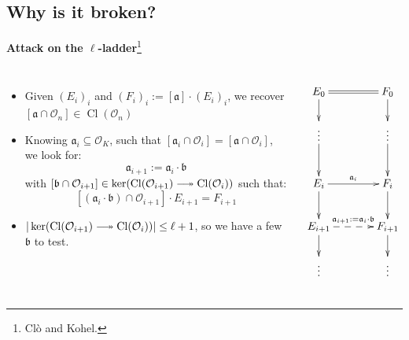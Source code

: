 \documentclass[10pt]{beamer}
\theoremstyle{plain}
\theoremstyle{definition}
\newcommand{\mO}{\mathcal{O}}
\renewcommand{\(}{\left(}
\renewcommand{\)}{\right)}
\newcommand{\mf}[1]{\mathfrak{#1}}
\DeclareMathOperator{\Cl}{Cl}
\begin{document}
\subsection{Why is it broken?}

\begin{frame}
\textbf{Attack on the $\ell$-ladder}\footnote[frame]{Cl\`{o} and Kohel.}

\begin{columns}[t]

\begin{itemize}
\item Given $(E_i)_{i}$ and $(F_i)_i:=[\mf{a}]\cdot (E_i)_i$, we recover $[\mf{a}\cap\mO_n]\in\Cl(\mO_n)$

\item Knowing $\mf{a}_i\subseteq \mO_K$, such that $[\mf{a}_i\cap\mO_i]=[\mf{a}\cap \mO_i]$, we look for:
\[\mf{a}_{i+1}:=\mf{a}_i\cdot \mf{b}\]
with $[\mf{b}\cap\mO_{i+1}]\in\ker(\Cl(\mO_{i+1})\relbar\joinrel\twoheadrightarrow\Cl(\mO_{i}))$ such that:
\[[(\mf{a}_i\cdot \mf{b})\cap\mO_{i+1}]\cdot E_{i+1}=F_{i+1}\]

\item $|\ker(\Cl(\mO_{i+1})\relbar\joinrel\twoheadrightarrow\Cl(\mO_{i}))|\leq\ell+1$, so we have a few $\mf{b}$ to test.
\end{itemize}

\[\xymatrix@C+1pc{
E_0 \ar[d] \ar@2{-}[r]& F_0\ar[d]\\
\vdots \ar[d] & \vdots \ar[d]\\
E_i \ar[d] \ar[r]^{\mf{a}_i} & F_i\ar[d]\\
E_{i+1} \ar[d] \ar@{-->}[r]^{\mf{a}_{i+1}:=\mf{a}_i\cdot\mf{b}} & F_{i+1}\ar[d]\\
\vdots & \vdots\\
}\]
\end{columns}

\end{frame}





\end{document}
